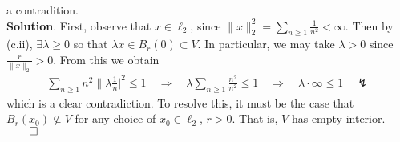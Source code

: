\documentclass[10pt]{article}
\newcommand{\1}[1]{\mathbbm{1}_{#1}}
\begin{document}
    a contradition.\\[5pt]
    {\bf Solution}. First, observe that $x\in\ell_2$, since
    $\|x\|_2^2=\sum_{n\geq 1}\tfrac{1}{n^2}<\infty$. Then by (c.ii), $\exists
    \lambda\geq 0$ so that $\lambda x\in B_r(0)\subset V$. In particular, we may
    take $\lambda>0$ since $\tfrac{r}{\|x\|_2}>0$. From this we obtain
    \begin{align*}
        \sum_{n\geq 1}n^2\|\lambda\frac{1}{n}|^2\leq 1\quad\Rightarrow\quad\lambda\sum_{n\geq 1}\frac{n^2}{n^2}\leq 1\quad\Rightarrow\quad\lambda\cdot\infty\leq 1\quad\lightning
    \end{align*}
    which is a clear contradiction. To resolve this, it must be the case that
    $B_r(x_0)\nsubseteq V$ for any choice of $x_0\in\ell_2$, $r>0$. That is, $V$
    has empty interior.\hfill{$\qed$}
\end{document}
